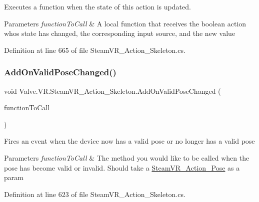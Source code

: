 Executes a function when the state of this action is updated. 


\begin{DoxyParams}{Parameters}
{\em function\+To\+Call} & A local function that receives the boolean action who\textquotesingle{}s state has changed, the corresponding input source, and the new value\\
\hline
\end{DoxyParams}


Definition at line 665 of file Steam\+V\+R\+\_\+\+Action\+\_\+\+Skeleton.\+cs.

\mbox{\label{class_valve_1_1_v_r_1_1_steam_v_r___action___skeleton_a22c2be947605d84b1eb6f0742a882e4b}} 
\subsubsection{\texorpdfstring{AddOnValidPoseChanged()}{AddOnValidPoseChanged()}}
{\footnotesize\ttfamily void Valve.\+V\+R.\+Steam\+V\+R\+\_\+\+Action\+\_\+\+Skeleton.\+Add\+On\+Valid\+Pose\+Changed (\begin{DoxyParamCaption}\item[{\mbox{\hyperlink{class_valve_1_1_v_r_1_1_steam_v_r___action___skeleton_af5ad5e815b7f555aa33ee8b74385e89e}{Valid\+Pose\+Change\+Handler}}}]{function\+To\+Call }\end{DoxyParamCaption})}



Fires an event when the device now has a valid pose or no longer has a valid pose 


\begin{DoxyParams}{Parameters}
{\em function\+To\+Call} & The method you would like to be called when the pose has become valid or invalid. Should take a \mbox{\hyperlink{class_valve_1_1_v_r_1_1_steam_v_r___action___pose}{Steam\+V\+R\+\_\+\+Action\+\_\+\+Pose}} as a param\\
\hline
\end{DoxyParams}


Definition at line 623 of file Steam\+V\+R\+\_\+\+Action\+\_\+\+Skeleton.\+cs.

\mbox{\label{class_valve_1_1_v_r_1_1_steam_v_r___action___skeleton_a41a68545cb313ef9f47600d9e9022177}} 

